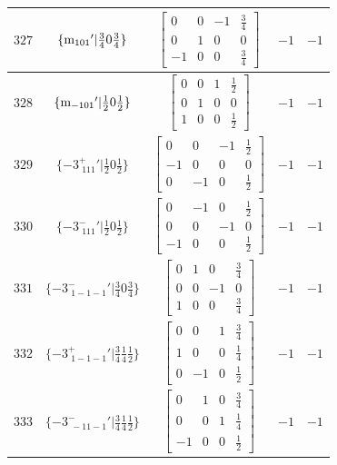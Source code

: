 \documentclass[fleqn,8pt]{jsarticle}
\begin{document}
\begin{longtable}{ccccc}
$ 327 $ & $ \{{\rm m}_{101}{}'|\frac{3}{4} 0 \frac{3}{4}\} $ & $ \begin{bmatrix} 0 & 0 & -1 & \frac{3}{4} \\ 0 & 1 & 0 & 0 \\ -1 & 0 & 0 & \frac{3}{4} \end{bmatrix} $ & $ -1 $ & $ -1 $ \\ \hline
$ 328 $ & $ \{{\rm m}_{-101}{}'|\frac{1}{2} 0 \frac{1}{2}\} $ & $ \begin{bmatrix} 0 & 0 & 1 & \frac{1}{2} \\ 0 & 1 & 0 & 0 \\ 1 & 0 & 0 & \frac{1}{2} \end{bmatrix} $ & $ -1 $ & $ -1 $ \\ \hline
$ 329 $ & $ \{-3^{+}_{\,\,111}{}'|\frac{1}{2} 0 \frac{1}{2}\} $ & $ \begin{bmatrix} 0 & 0 & -1 & \frac{1}{2} \\ -1 & 0 & 0 & 0 \\ 0 & -1 & 0 & \frac{1}{2} \end{bmatrix} $ & $ -1 $ & $ -1 $ \\ \hline
$ 330 $ & $ \{-3^{-}_{\,\,111}{}'|\frac{1}{2} 0 \frac{1}{2}\} $ & $ \begin{bmatrix} 0 & -1 & 0 & \frac{1}{2} \\ 0 & 0 & -1 & 0 \\ -1 & 0 & 0 & \frac{1}{2} \end{bmatrix} $ & $ -1 $ & $ -1 $ \\ \hline
$ 331 $ & $ \{-3^{-}_{\,\,1-1-1}{}'|\frac{3}{4} 0 \frac{3}{4}\} $ & $ \begin{bmatrix} 0 & 1 & 0 & \frac{3}{4} \\ 0 & 0 & -1 & 0 \\ 1 & 0 & 0 & \frac{3}{4} \end{bmatrix} $ & $ -1 $ & $ -1 $ \\ \hline
$ 332 $ & $ \{-3^{+}_{\,\,1-1-1}{}'|\frac{3}{4} \frac{1}{4} \frac{1}{2}\} $ & $ \begin{bmatrix} 0 & 0 & 1 & \frac{3}{4} \\ 1 & 0 & 0 & \frac{1}{4} \\ 0 & -1 & 0 & \frac{1}{2} \end{bmatrix} $ & $ -1 $ & $ -1 $ \\ \hline
$ 333 $ & $ \{-3^{-}_{\,\,-11-1}{}'|\frac{3}{4} \frac{1}{4} \frac{1}{2}\} $ & $ \begin{bmatrix} 0 & 1 & 0 & \frac{3}{4} \\ 0 & 0 & 1 & \frac{1}{4} \\ -1 & 0 & 0 & \frac{1}{2} \end{bmatrix} $ & $ -1 $ & $ -1 $ \\ \hline

\end{longtable}
\end{document}

